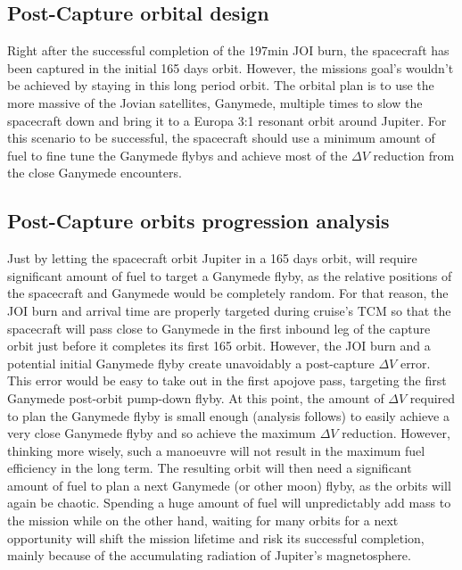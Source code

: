 \subsection{Post-Capture orbital design}
Right after the successful completion of the 197min JOI burn, the spacecraft has been captured in the initial 165 days orbit. However, the missions goal's wouldn't be achieved by staying in this long period orbit. The orbital plan is to use the more massive of the Jovian satellites, Ganymede, multiple times to slow the spacecraft down and bring it to a Europa 3:1 resonant orbit around Jupiter. For this scenario to be successful, the spacecraft should use a minimum amount of fuel to fine tune the Ganymede flybys and achieve most of the $\Delta V$ reduction from the close Ganymede encounters. 
\subsection{Post-Capture orbits progression analysis}
Just by letting the spacecraft orbit Jupiter in a 165 days orbit, will require significant amount of fuel to target a Ganymede flyby, as the relative positions of the spacecraft and Ganymede would be completely random. For that reason, the JOI burn and arrival time are properly targeted during cruise's TCM so that the spacecraft will pass close to Ganymede in the first inbound leg of the capture orbit just before it completes its first 165 orbit. However, the JOI burn and a potential initial Ganymede flyby create unavoidably a post-capture $\Delta V$ error. This  error would be easy to take out in the first apojove pass, targeting the first Ganymede post-orbit pump-down flyby. At this point, the amount of $\Delta V$ required to plan the Ganymede flyby is small enough (analysis follows) to easily achieve a very close Ganymede flyby and so achieve the maximum $\Delta V$ reduction. However, thinking more wisely, such a manoeuvre will not result in the maximum fuel efficiency in the long term. The resulting orbit will then need a significant amount of fuel to plan a next Ganymede (or other moon) flyby, as the orbits will again be chaotic. Spending a huge amount of fuel will unpredictably add mass to the mission while on the other hand, waiting for many orbits for a next opportunity will shift the mission lifetime and risk its successful completion, mainly because of the accumulating radiation of Jupiter's magnetosphere.

